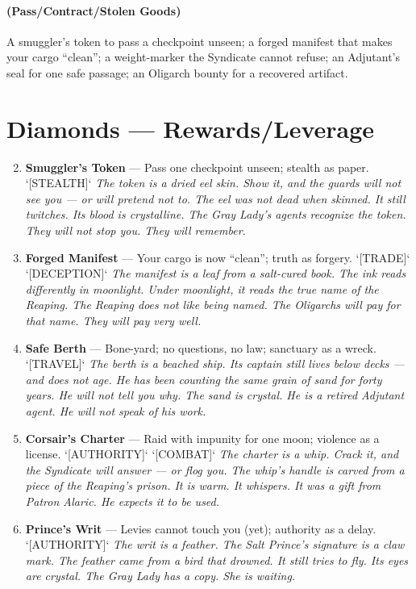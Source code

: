 \paragraph*{(Pass/Contract/Stolen Goods)} A smuggler's token to pass a checkpoint unseen; a forged manifest that makes your cargo ``clean''; a weight-marker the Syndicate cannot refuse; an Adjutant's seal for one safe passage; an Oligarch bounty for a recovered artifact.

\section*{Diamonds --- Rewards/Leverage}
\label{sec:zakov-rewards}
\begin{enumerate}
\setcounter{enumi}{1}
\item \textbf{Smuggler's Token} --- Pass one checkpoint unseen; stealth as paper. `[STEALTH]`
  \hfill \textit{The token is a dried eel skin. Show it, and the guards will not see you --- or will pretend not to. The eel was not dead when skinned. It still twitches. Its blood is crystalline. The Gray Lady's agents recognize the token. They will not stop you. They will remember.}
\item \textbf{Forged Manifest} --- Your cargo is now ``clean''; truth as forgery. `[TRADE]` `[DECEPTION]`
  \hfill \textit{The manifest is a leaf from a salt-cured book. The ink reads differently in moonlight. Under moonlight, it reads the true name of the Reaping. The Reaping does not like being named. The Oligarchs will pay for that name. They will pay very well.}
\item \textbf{Safe Berth} --- Bone-yard; no questions, no law; sanctuary as a wreck. `[TRAVEL]`
  \hfill \textit{The berth is a beached ship. Its captain still lives below decks --- and does not age. He has been counting the same grain of sand for forty years. He will not tell you why. The sand is crystal. He is a retired Adjutant agent. He will not speak of his work.}
\item \textbf{Corsair's Charter} --- Raid with impunity for one moon; violence as a license. `[AUTHORITY]` `[COMBAT]`
  \hfill \textit{The charter is a whip. Crack it, and the Syndicate will answer --- or flog you. The whip's handle is carved from a piece of the Reaping's prison. It is warm. It whispers. It was a gift from Patron Alaric. He expects it to be used.}
\item \textbf{Prince's Writ} --- Levies cannot touch you (yet); authority as a delay. `[AUTHORITY]`
  \hfill \textit{The writ is a feather. The Salt Prince's signature is a claw mark. The feather came from a bird that drowned. It still tries to fly. Its eyes are crystal. The Gray Lady has a copy. She is waiting.}

\end{enumerate}
